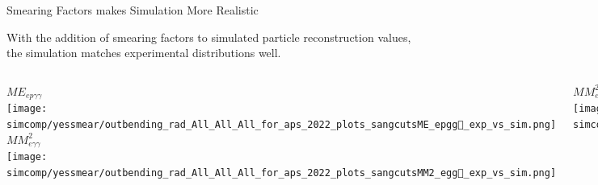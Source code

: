 \documentclass[aspectratio=169]{beamer}
\newcommand*{\myfont}{\fontfamily{lmtt}\selectfont}
\begin{document}
\begin{frame}{Smearing Factors makes Simulation More Realistic}

With the addition of smearing factors to simulated particle reconstruction values, the simulation matches experimental distributions well.  {\myfont{\footnotesize [Collaborator S. Lee]}}



\vspace{0.2cm}
\begin{columns}
                     \centering $ME_{ep\gamma\gamma}$ \\
                   	\texttt{[image: simcomp/yessmear/outbending\_rad\_All\_All\_All\_for\_aps\_2022\_plots\_sangcutsME\_epgg\_exp\_vs\_sim.png]}
                   	   \centering  $MM^2_{e\gamma\gamma}$ \\
                	\texttt{[image: simcomp/yessmear/outbending\_rad\_All\_All\_All\_for\_aps\_2022\_plots\_sangcutsMM2\_egg\_exp\_vs\_sim.png]}


     
                       \centering  $MM^2_{ep\gamma\gamma}$ \\
                	\texttt{[image: simcomp/yessmear/outbending\_rad\_All\_All\_All\_for\_aps\_2022\_plots\_sangcutsMM2\_epgg\_exp\_vs\_sim.png]}
   
                      \centering   $MM^2_{ep}$ \\
                	\texttt{[image: simcomp/yessmear/outbending\_rad\_All\_All\_All\_for\_aps\_2022\_plots\_sangcutsMM2\_ep\_exp\_vs\_sim.png]}

            

                      \centering   $M_{\gamma\gamma}$ \\
                	\texttt{[image: simcomp/yessmear/outbending\_rad\_All\_All\_All\_for\_aps\_2022\_plots\_sangcutsMpi0\_exp\_vs\_sim.png]}
 
                       \centering  $\Delta p_{t}$ \\
                	\texttt{[image: simcomp/yessmear/outbending\_rad\_All\_All\_All\_for\_aps\_2022\_plots\_sangcutsMPt\_exp\_vs\_sim.png]}

    \end{columns}
\end{frame} 
\end{document}
